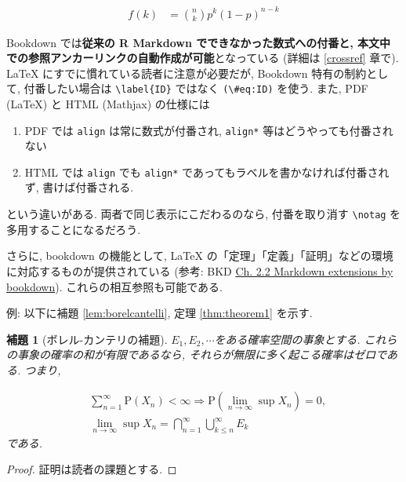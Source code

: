 \documentclass[
]{bxjsbook}
\providecommand{\tightlist}{%
  \setlength{\itemsep}{0pt}\setlength{\parskip}{0pt}}
\newtheorem{lemma}{補題}[chapter]
\theoremstyle{definition}
\theoremstyle{definition}
\theoremstyle{definition}
\theoremstyle{remark}
\begin{document}
\begin{align}
f(k) &= {n \choose k} p^{k} (1-p)^{n-k} \label{eq:binom}
\end{align}

Bookdown では\textbf{従来の R Markdown でできなかった数式への付番と,
本文中での参照アンカーリンクの自動作成が可能}となっている (詳細は
\ref{crossref} 章で). LaTeX にすでに慣れている読者に注意が必要だが,
Bookdown 特有の制約として, 付番したい場合は
\texttt{\textbackslash{}label\{ID\}} ではなく
\texttt{(\textbackslash{}\#eq:ID)} を使う. また, PDF (LaTeX) と HTML
(Mathjax) の仕様には

\begin{enumerate}
\def\labelenumi{\arabic{enumi}.}
\tightlist
\item
  PDF では \texttt{align} は常に数式が付番され, \texttt{align*}
  等はどうやっても付番されない
\item
  HTML では \texttt{align} でも \texttt{align*}
  であってもラベルを書かなければ付番されず, 書けば付番される.
\end{enumerate}

という違いがある. 両者で同じ表示にこだわるのなら, 付番を取り消す
\texttt{\textbackslash{}notag} を多用することになるだろう.

さらに, bookdown の機能として, LaTeX
の「定理」「定義」「証明」などの環境に対応するものが提供されている
(参考: BKD
\href{https://bookdown.org/yihui/bookdown/markdown-extensions-by-bookdown.html}{Ch.
2.2 Markdown extensions by bookdown}). これらの相互参照も可能である.

例: 以下に補題 \ref{lem:borelcantelli}, 定理 \ref{thm:theorem1} を示す.

\begin{lemma}[ボレル-カンテリの補題]
\protect\hypertarget{lem:borelcantelli}{}{\label{lem:borelcantelli}
{}
}\({E_1,E_2,\cdots}\)をある確率空間の事象とする.
これらの事象の確率の和が有限であるなら,
それらが無限に多く起こる確率はゼロである. つまり,

\begin{align*}
& \sum_{n=1}^\infty \mathrm{P}(X_n) <\infty \Rightarrow \mathrm{P}\left(\lim_{n\to\infty}\sup X_n\right) = 0,\\
& \lim_{n\to\infty}\sup X_n = \bigcap_{n=1}^\infty\bigcup_{k\leq n}^\infty E_k
\end{align*}
である. \end{lemma}

\begin{proof}
{}証明は読者の課題とする. \end{proof}
\end{document}

